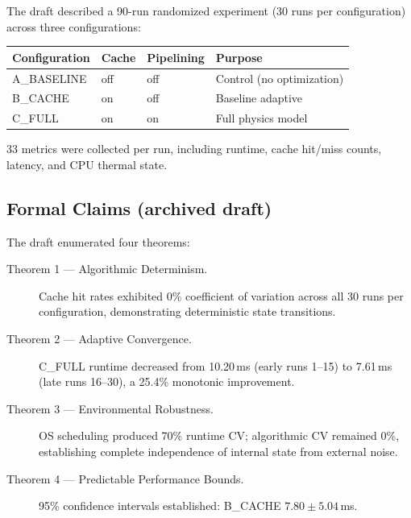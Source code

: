 The draft described a 90-run randomized experiment (30 runs per
configuration) across three configurations:

\begin{center}
\begin{tabular}{lllp{5cm}}
\toprule
Configuration & Cache & Pipelining & Purpose \\
\midrule
A\_BASELINE & off & off & Control (no optimization) \\
B\_CACHE    & on  & off & Baseline adaptive \\
C\_FULL     & on  & on  & Full physics model \\
\bottomrule
\end{tabular}
\end{center}

33 metrics were collected per run, including runtime, cache hit/miss counts,
latency, and CPU thermal state.

\subsection{Formal Claims (archived draft)}

The draft enumerated four theorems:

\begin{description}
  \item[Theorem 1 — Algorithmic Determinism.]
        Cache hit rates exhibited 0\% coefficient of variation across all
        30 runs per configuration, demonstrating deterministic state
        transitions.
  \item[Theorem 2 — Adaptive Convergence.]
        C\_FULL runtime decreased from 10.20\,ms (early runs 1--15) to
        7.61\,ms (late runs 16--30), a 25.4\% monotonic improvement.
  \item[Theorem 3 — Environmental Robustness.]
        OS scheduling produced 70\% runtime CV; algorithmic CV remained 0\%,
        establishing complete independence of internal state from external
        noise.
  \item[Theorem 4 — Predictable Performance Bounds.]
        95\% confidence intervals established: B\_CACHE $7.80 \pm 5.04$\,ms.
\end{description}

